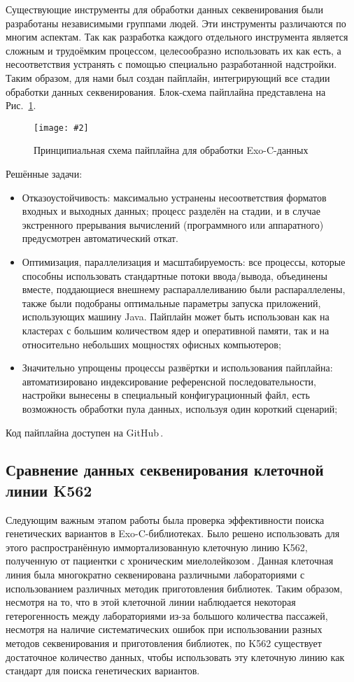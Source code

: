 \documentclass[a4paper,14pt]{extarticle}
\newcommand{\centerfigure}[5]
{\begin{figure}[#1]\centering\texttt{[image: \#2]}\caption{\label{#3}#4}\end{figure}}
\newcommand{\ecitep}[1]{\textenglish{\citep{#1}}}
\newcommand{\picref}[1]{Рис.~\ref{#1}}
\begin{document}
Существующие инструменты для обработки данных секвенирования были разработаны независимыми группами людей.
Эти инструменты различаются по многим аспектам.
Так как разработка каждого отдельного инструмента является сложным и трудоёмким процессом, целесообразно использовать их как есть, а несоответствия устранять с помощью специально разработанной надстройки.
Таким образом, для нами был создан пайплайн, интегрирующий все стадии обработки данных секвенирования.
Блок-схема пайплайна представлена на \picref{fig:pipeline}.

\centerfigure{h}{BlockScheme.pdf}{fig:pipeline}{Принципиальная схема пайплайна для обработки Exo-C-данных}{1}

Решённые задачи:

\begin{itemize}
	\item Отказоустойчивость: максимально устранены несоответствия форматов входных и выходных данных; процесс разделён на стадии, и в случае экстренного прерывания вычислений (программного или аппаратного) предусмотрен автоматический откат.
	\item Оптимизация, параллелизация и масштабируемость: все процессы, которые способны использовать стандартные потоки ввода/вывода, объединены вместе, поддающиеся внешнему распараллеливанию были распараллелены, также были подобраны оптимальные параметры запуска приложений, использующих машину Java.
	 Пайплайн может быть использован как на кластерах с большим количеством ядер и оперативной памяти, так и на относительно небольших мощностях офисных компьютеров;
	\item Значительно упрощены процессы развёртки и использования пайплайна: автоматизировано индексирование референсной последовательности, настройки вынесены в специальный конфигурационный файл, есть возможность обработки пула данных, используя один короткий сценарий;
\end{itemize}

Код пайплайна доступен на GitHub\,\ecitep{Scissors}.

\subsection{Сравнение данных секвенирования клеточной линии K562}

Следующим важным этапом работы была проверка эффективности поиска генетических вариантов в Exo-C\hyp{}библиотеках.
Было решено использовать для этого распространённую иммортализованную клеточную линию K562, полученную от пациентки с хроническим миелолейкозом\,\ecitep{Lozzio_1975}.
Данная клеточная линия была многократно секвенирована различными лабораториями с использованием различных методик приготовления библиотек.
Таким образом, несмотря на то, что в этой клеточной линии наблюдается некоторая гетерогенность между лабораториями из-за большого количества пассажей, несмотря на наличие систематических ошибок при использовании разных методов секвенирования и приготовления библиотек, по K562 существует достаточное количество данных, чтобы использовать эту клеточную линию как стандарт для поиска генетических вариантов.
\end{document}

